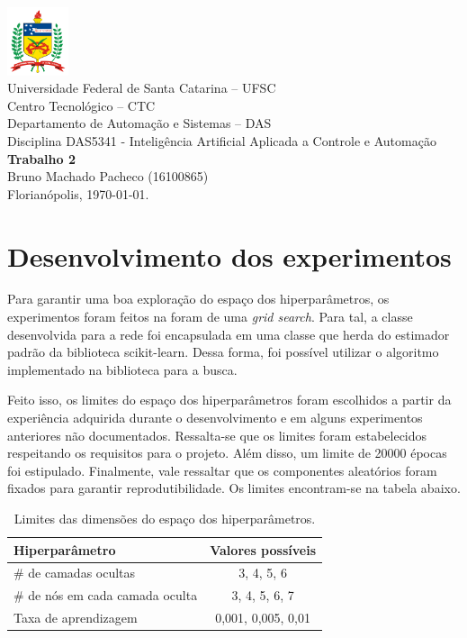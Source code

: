 \documentclass[a4paper,11pt]{article}
\begin{document}
	\thispagestyle{empty}
\begin{center}
	\includegraphics[height=2cm]{imagens/logoUFSCsimples.png} \\
	{\Large Universidade Federal de Santa Catarina -- UFSC} \\
	{\Large Centro Tecnológico -- CTC} \\
	{\Large Departamento de Automação e Sistemas -- DAS} \\
	\vspace{1cm}
	{\large Disciplina DAS5341 - Inteligência Artificial Aplicada a Controle e Automação} \\
	\vfill
	\large{\textbf{Trabalho 2} \\
	} 
	\vspace{1cm}
    Bruno Machado Pacheco (16100865) \\
    \vfill
	Florianópolis, \today.
\end{center}

\clearpage


\section*{Desenvolvimento dos experimentos}

Para garantir uma boa exploração do espaço dos hiperparâmetros, os experimentos foram feitos na foram de uma \emph{grid search}. Para tal, a classe desenvolvida para a rede foi encapsulada em uma classe que herda do estimador padrão da biblioteca scikit-learn. Dessa forma, foi possível utilizar o algoritmo implementado na biblioteca para a busca.

Feito isso, os limites do espaço dos hiperparâmetros foram escolhidos a partir da experiência adquirida durante o desenvolvimento e em alguns experimentos anteriores não documentados. Ressalta-se que os limites foram estabelecidos respeitando os requisitos para o projeto. Além disso, um limite de 20000 épocas foi estipulado. Finalmente, vale ressaltar que os componentes aleatórios foram fixados para garantir reprodutibilidade. Os limites encontram-se na tabela abaixo.

\begin{table}[H]
    \centering
    \begin{tabular}{l | c}
    Hiperparâmetro & Valores possíveis \\
    \hline
    \# de camadas ocultas & 3, 4, 5, 6 \\
    \# de nós em cada camada oculta & 3, 4, 5, 6, 7 \\
    Taxa de aprendizagem & 0,001, 0,005, 0,01
    \end{tabular}
    \caption{Limites das dimensões do espaço dos hiperparâmetros.}
    \label{tab:label}
\end{table}
\end{document}
